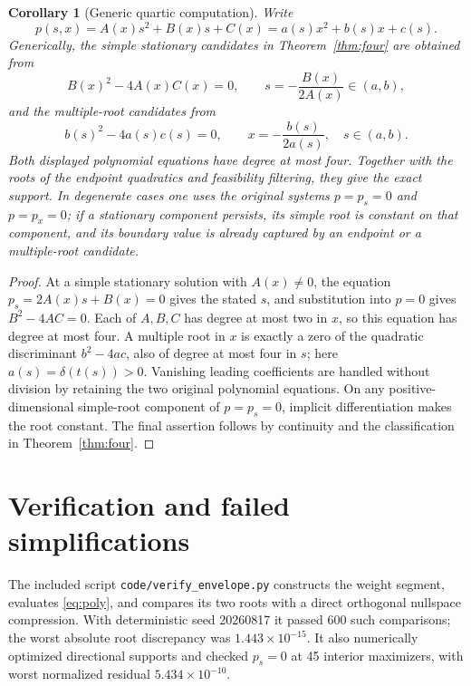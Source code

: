 \documentclass[11pt]{article}
\numberwithin{equation}{section}
\newtheorem{corollary}[theorem]{Corollary}
\theoremstyle{definition}
\begin{document}
\begin{corollary}[Generic quartic computation]\label{cor:quartic}
Write
\[
 p(s,x)=A(x)s^2+B(x)s+C(x)
       =a(s)x^2+b(s)x+c(s).
\]
Generically, the simple stationary candidates in Theorem~\ref{thm:four} are
obtained from
\begin{equation}
 B(x)^2-4A(x)C(x)=0,\qquad
 s=-\frac{B(x)}{2A(x)}\in(a,b),
 \label{eq:quartic-stat}
\end{equation}
and the multiple-root candidates from
\begin{equation}
 b(s)^2-4a(s)c(s)=0,\qquad
 x=-\frac{b(s)}{2a(s)},\quad s\in(a,b).
 \label{eq:quartic-mult}
\end{equation}
Both displayed polynomial equations have degree at most four.  Together with
the roots of the endpoint quadratics and feasibility filtering, they give the
exact support.  In degenerate cases one uses the original systems
$p=p_s=0$ and $p=p_x=0$; if a stationary component persists, its simple root
is constant on that component, and its boundary value is already captured by
an endpoint or a multiple-root candidate.
\end{corollary}

\begin{proof}
At a simple stationary solution with $A(x)\neq0$, the equation
$p_s=2A(x)s+B(x)=0$ gives the stated $s$, and substitution into $p=0$ gives
$B^2-4AC=0$.  Each of $A,B,C$ has degree at most two in $x$, so this equation
has degree at most four.  A multiple root in $x$ is exactly a zero of the
quadratic discriminant $b^2-4ac$, also of degree at most four in $s$; here
$a(s)=\delta(t(s))>0$.  Vanishing leading coefficients are handled without
division by retaining the two original polynomial equations.  On any
positive-dimensional simple-root component of $p=p_s=0$, implicit
differentiation makes the root constant.  The final assertion follows by
continuity and the classification in Theorem~\ref{thm:four}.
\end{proof}

\section{Verification and failed simplifications}

The included script \texttt{code/verify\_envelope.py} constructs the weight
segment, evaluates \eqref{eq:poly}, and compares its two roots with a direct orthogonal
nullspace compression.  With deterministic seed 20260817 it passed 600 such
comparisons; the worst absolute root discrepancy was
$1.443\times10^{-15}$.  It also numerically optimized directional supports
and checked $p_s=0$ at 45 interior maximizers, with worst normalized residual
$5.434\times10^{-10}$.
\end{document}
